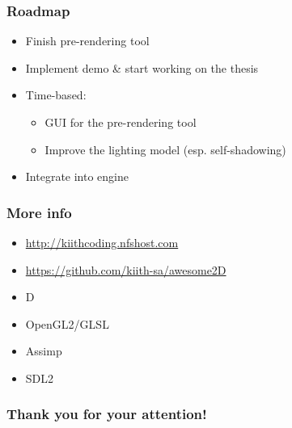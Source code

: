 \documentclass{beamer}
\begin{document}
\begin{frame}\frametitle{Roadmap}

\begin{itemize}
\item
  Finish pre-rendering tool
\item
  Implement demo \& start working on the thesis
\item
  Time-based:

  \begin{itemize}
  \item
    GUI for the pre-rendering tool
  \item
    Improve the lighting model (esp. self-shadowing)
  \end{itemize}
\item
  Integrate into engine
\end{itemize}

\end{frame}

\begin{frame}\frametitle{More info}

\begin{itemize}
\item
  \href{http://kiithcoding.nfshost.com}{http://kiithcoding.nfshost.com}
\item
  \href{https://github.com/kiith-sa/awesome2D}{https://github.com/kiith-sa/awesome2D}
\item
  D
\item
  OpenGL2/GLSL
\item
  Assimp
\item
  SDL2
\end{itemize}

\end{frame}

\begin{frame}\frametitle{Thank you for your attention!}

\end{frame}
\end{document}
